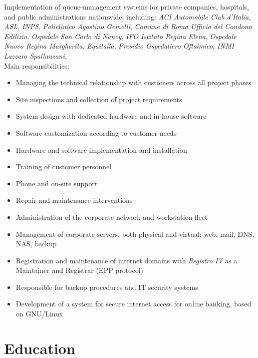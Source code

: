         {Implementation of queue-management systems for private companies, hospitals, and public administrations nationwide, including: \emph{ACI Automobile Club d'Italia}, \emph{ASL}, \emph{INPS}, \emph{Policlinico Agostino Gemelli}, \emph{Comune di Roma Ufficio del Condono Edilizio}, \emph{Ospedale San Carlo di Nancy}, \emph{IFO Istituto Regina Elena}, \emph{Ospedale Nuovo Regina Margherita}, \emph{Equitalia}, \emph{Presidio Ospedaliero Oftalmico}, \emph{INMI Lazzaro Spallanzani}.\\ Main responsibilities:
          \begin{itemize}
          \item Managing the technical relationship with customers across all project phases
          \item Site inspections and collection of project requirements
          \item System design with dedicated hardware and in-house software
          \item Software customization according to customer needs
          \item Hardware and software implementation and installation
          \item Training of customer personnel
          \item Phone and on-site support
          \item Repair and maintenance interventions
          \end{itemize}}
\vspace{3mm}
        {\begin{itemize}
          \item Administration of the corporate network and workstation fleet
          \item Management of corporate servers, both physical and virtual: web, mail, DNS, NAS, backup
          \item Registration and maintenance of internet domains with \emph{Registro IT} as a Maintainer and Registrar (EPP protocol)
          \item Responsible for backup procedures and IT security systems
          \item Development of a system for secure internet access for online banking, based on GNU/Linux
        \end{itemize}}
\section{Education}
